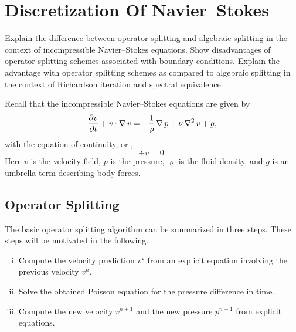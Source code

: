 \chapter[Navier--Stokes]{Discretization Of Navier--Stokes}

\begin{problem_text}
    Explain the difference between operator splitting and algebraic splitting
    in the context of incompressible Navier--Stokes equations. Show
    disadvantages of operator splitting schemes associated with boundary
    conditions. Explain the advantage with operator splitting schemes as
    compared to algebraic splitting in the context of Richardson iteration and
    spectral equivalence.
\end{problem_text}

Recall that the incompressible Navier--Stokes equations are given by
\begin{equation}
    \label{eq:NS}
    \frac{\partial v}{\partial t} + v \cdot \operatorname{\mathop{}\!\nabla} v = -\frac{1}{\varrho} \operatorname{\mathop{}\!\nabla} p + \nu \operatorname{\mathop{}\!\nabla}^2 v + g,
\end{equation}
with the equation of continuity, or ,
\begin{equation}
    \label{eq:NSc}
    \div v = 0.
\end{equation}
Here \( v \) is the velocity field, \( p \) is the pressure, \( \varrho \) is
the fluid density, and \( g \) is an umbrella term describing body forces.

\section{Operator Splitting}
\label{sub:operator_splitting}

The basic operator splitting algorithm can be summarized in three steps.  These
steps will be motivated in the following.
\begin{enumerate}[(i)]
    \item Compute the velocity prediction \( v^\star \) from an explicit equation involving the previous velocity \( v^n \).
    \item Solve the obtained Poisson equation for the pressure difference in time.
    \item Compute the new velocity \( v^{n+1} \) and the new pressure \(
        p^{n+1} \) from explicit equations.
\end{enumerate}

